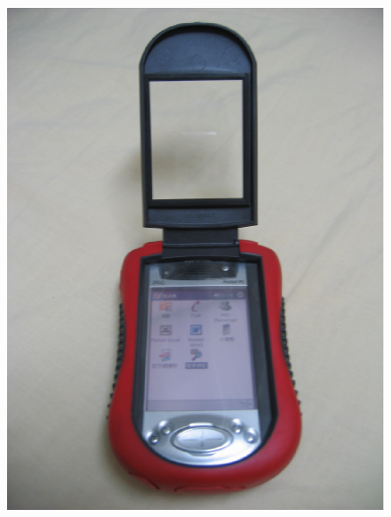 \documentclass[12pt,a4paper]{article}
\begin{document}
\begin{CJK}{UTF8}{bsmi}
\begin{figure}[htbp]
\centering
\includegraphics[scale=0.35]{eps/shell_6.eps}%
\hspace{0.5cm}%

\end{figure}
\end{CJK}
\end{document}
